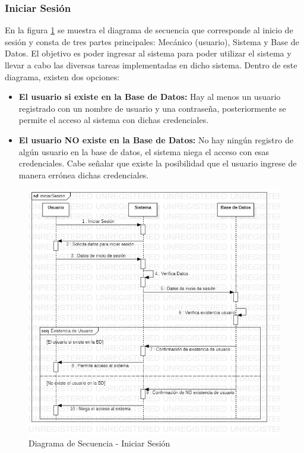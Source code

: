 \subsubsection{Iniciar Sesión}
En la figura \ref{fig:Diagrama de Secuencia - Iniciar Sesión} se muestra el diagrama de secuencia que corresponde al inicio de sesión y consta de tres partes principales: Mecánico (usuario), Sistema y Base de Datos. El objetivo es poder ingresar al sistema para poder utilizar el sistema y llevar a cabo las diversas tareas implementadas en dicho sistema. Dentro de este diagrama, existen dos opciones:
\begin{itemize}
	\item \textbf{El usuario si existe en la Base de Datos:} Hay al menos un usuario registrado con un nombre de usuario y una contraseña, posteriormente se permite el acceso al sistema con dichas credenciales.
	\item \textbf{El usuario NO existe en la Base de Datos:} No hay ningún registro de algún usuario en la base de datos, el sistema niega el acceso con esas credenciales. Cabe señalar que existe la posibilidad que el usuario ingrese de manera errónea dichas credenciales.
\end{itemize} 
\begin{figure}[!h]
	\centering
	\includegraphics[width=1\textwidth]{./diseno/vprocesos/imagenes/iniciarSesion}
	\caption{Diagrama de Secuencia - Iniciar Sesión}
	\label{fig:Diagrama de Secuencia - Iniciar Sesión}
\end{figure}
\clearpage